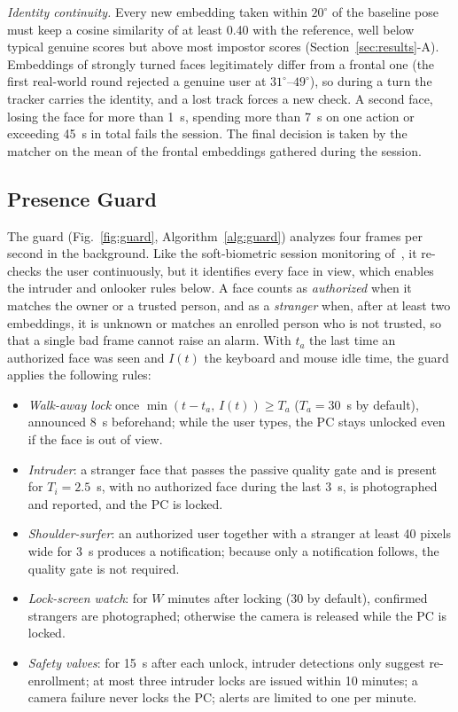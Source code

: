 \documentclass{ieeeaccess}
\begin{document}
\emph{Identity continuity.} Every new embedding taken within $20^\circ$ of the baseline pose must keep a cosine similarity of at least 0.40 with the reference, well below typical genuine scores but above most impostor scores (Section~\ref{sec:results}-A). Embeddings of strongly turned faces legitimately differ from a frontal one (the first real-world round rejected a genuine user at $31^\circ$--$49^\circ$), so during a turn the tracker carries the identity, and a lost track forces a new check. A second face, losing the face for more than 1~s, spending more than 7~s on one action or exceeding 45~s in total fails the session. The final decision is taken by the matcher on the mean of the frontal embeddings gathered during the session.

\subsection{Presence Guard}\label{sec:guard}
The guard (Fig.~\ref{fig:guard}, Algorithm~\ref{alg:guard}) analyzes four frames per second in the background. Like the soft-biometric session monitoring of~\cite{niinuma2010soft}, it re-checks the user continuously, but it identifies every face in view, which enables the intruder and onlooker rules below. A face counts as \emph{authorized} when it matches the owner or a trusted person, and as a \emph{stranger} when, after at least two embeddings, it is unknown or matches an enrolled person who is not trusted, so that a single bad frame cannot raise an alarm. With $t_a$ the last time an authorized face was seen and $I(t)$ the keyboard and mouse idle time, the guard applies the following rules:
\begin{itemize}
\item \emph{Walk-away lock} once $\min(t-t_a,\,I(t))\ge T_a$ ($T_a=30$~s by default), announced 8~s beforehand; while the user types, the PC stays unlocked even if the face is out of view.
\item \emph{Intruder}: a stranger face that passes the passive quality gate and is present for $T_i=2.5$~s, with no authorized face during the last 3~s, is photographed and reported, and the PC is locked.
\item \emph{Shoulder-surfer}: an authorized user together with a stranger at least 40 pixels wide for 3~s produces a notification; because only a notification follows, the quality gate is not required.
\item \emph{Lock-screen watch}: for $W$ minutes after locking (30 by default), confirmed strangers are photographed; otherwise the camera is released while the PC is locked.
\item \emph{Safety valves}: for 15~s after each unlock, intruder detections only suggest re-enrollment; at most three intruder locks are issued within 10 minutes; a camera failure never locks the PC; alerts are limited to one per minute.
\end{itemize}
\end{document}
